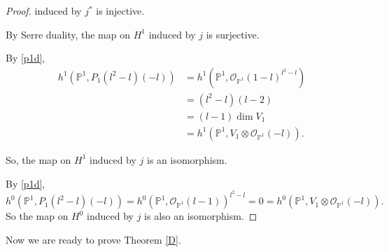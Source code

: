 \documentclass[11pt,letterpaper]{amsart}
\begin{document}
\begin{proof}
induced by $j^*$ is injective.

By Serre duality, the map on $H^1$ induced by $j$ is surjective.

By \eqref{p1d},
\begin{align*}
h^1\!\left(
\mathbb{P}^1,
P_1(l^2-l)(-l)
\right)
&=
h^1\!\left(
\mathbb{P}^1,
\mathcal{O}_{\mathbb{P}^1}(1-l)
^{l^2-l}\right)\\
&=
(l^2-l)(l-2)\\
&=
(l-1)\dim V_1\\
&=
h^1\!\left(
\mathbb{P}^1,
V_1\otimes\mathcal{O}_{\mathbb{P}^1}(-l)
\right).
\end{align*}

So, the map on $H^1$ induced by $j$ is an isomorphism.

By \eqref{p1d},
\[
h^0\!\left(
\mathbb{P}^1,
P_1(l^2-l)(-l)
\right)
=
h^0\!\left(
\mathbb{P}^1,
\mathcal{O}_{\mathbb{P}^1}(l-1)
\right)^{l^2-l}
=0
=
h^0\!\left(
\mathbb{P}^1,
V_1\otimes\mathcal{O}_{\mathbb{P}^1}(-l)
\right).
\]
So the map on $H^0$ induced by $j$ is also an isomorphism.
\end{proof}

Now we are ready to prove Theorem \ref{D}.
\end{document}
